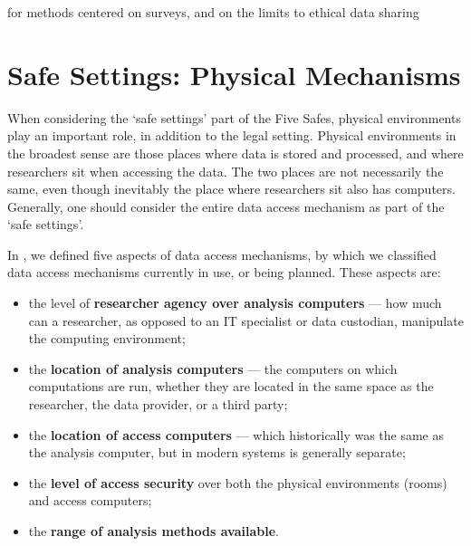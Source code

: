 
 for methods centered on surveys, and \cite{meyer_practical_2018} on the limits to ethical data sharing

\section{Safe Settings: Physical Mechanisms}

When considering the `safe settings' part of the Five Safes, physical environments play an important role, in addition to the legal setting. Physical environments in the broadest sense are those places where data is stored and processed, and where researchers sit when accessing the data. The two places are not necessarily the same, even though inevitably the place where researchers sit also has computers. Generally, one should consider the entire data access mechanism as part of the `safe settings'.

In \cite{shen_physically_2021}, we defined five aspects of data access mechanisms, by which we classified data access mechanisms currently in use, or being planned. These aspects are:
\begin{itemize}
    \item the level of \textbf{researcher agency over analysis computers} --- how much can a researcher, as opposed to an IT specialist or data custodian, manipulate the computing environment;
    \item the \textbf{location of analysis computers} --- the computers on which computations are run, whether they are located in the same space as the researcher, the data provider, or a third party;
    \item the \textbf{location of access computers} --- which historically was the same as the analysis computer, but in modern systems is generally separate;
    \item the \textbf{level of access security} over both the physical environments (rooms) and access computers;
    \item the \textbf{range of analysis methods available}.
\end{itemize}

